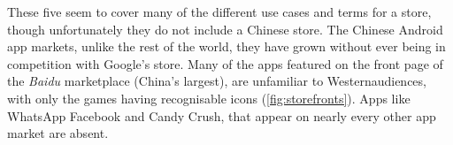 \documentclass[thesis.tex]{subfiles}
\begin{document}

These five seem to cover many of the different use cases and terms for
a store, though unfortunately they do not include a Chinese store.
The Chinese Android app markets, unlike the rest of
the world, they have grown without ever being in competition with
Google's store.  Many of the apps featured on the front page of the
\emph{Baidu} marketplace (China's largest), are unfamiliar to Westernaudiences, with only
the games having recognisable icons (\autoref{fig:storefronts}).  Apps
like WhatsApp Facebook and Candy Crush, that appear on nearly every
other app market are absent.
\end{document}
